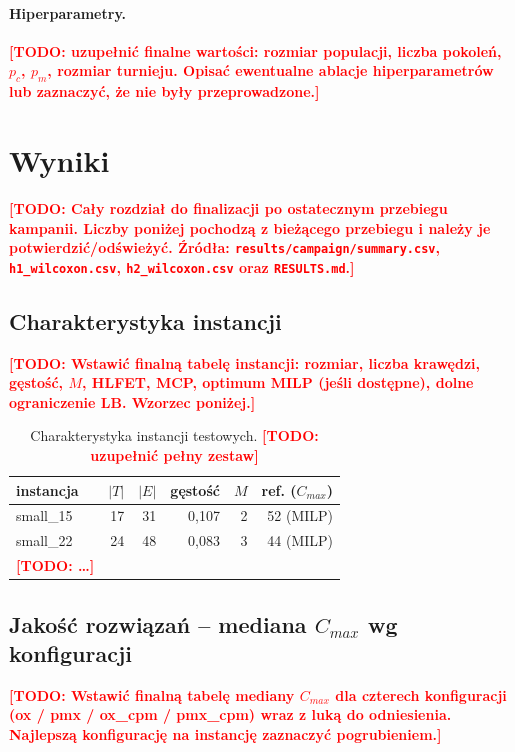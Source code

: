 \documentclass[12pt,a4paper]{article}
\newcommand{\todo}[1]{\textcolor{red}{\textbf{[TODO: #1]}}}
\begin{document}
\paragraph{Hiperparametry.} \todo{uzupełnić finalne wartości: rozmiar populacji, liczba pokoleń, $p_c$, $p_m$, rozmiar turnieju. Opisać ewentualne ablacje hiperparametrów lub zaznaczyć, że nie były przeprowadzone.}

\section{Wyniki}
\label{sec:wyniki}
\todo{Cały rozdział do finalizacji po ostatecznym przebiegu kampanii. Liczby poniżej pochodzą z bieżącego przebiegu i należy je potwierdzić/odświeżyć. Źródła: \texttt{results/campaign/summary.csv}, \texttt{h1\_wilcoxon.csv}, \texttt{h2\_wilcoxon.csv} oraz \texttt{RESULTS.md}.}

\subsection{Charakterystyka instancji}
\todo{Wstawić finalną tabelę instancji: rozmiar, liczba krawędzi, gęstość, $M$, HLFET, MCP, optimum MILP (jeśli dostępne), dolne ograniczenie LB. Wzorzec poniżej.}

\begin{table}[h]
\centering
\small
\begin{tabular}{lrrrrr}
\toprule
instancja & $|T|$ & $|E|$ & gęstość & $M$ & ref. ($C_{max}$) \\
\midrule
small\_15 & 17 & 31 & 0{,}107 & 2 & 52 (MILP) \\
small\_22 & 24 & 48 & 0{,}083 & 3 & 44 (MILP) \\
\todo{\dots} & & & & & \\
\bottomrule
\end{tabular}
\caption{Charakterystyka instancji testowych. \todo{uzupełnić pełny zestaw}}
\label{tab:instances}
\end{table}

\subsection{Jakość rozwiązań -- mediana $C_{max}$ wg konfiguracji}
\todo{Wstawić finalną tabelę mediany $C_{max}$ dla czterech konfiguracji (ox / pmx / ox\_cpm / pmx\_cpm) wraz z luką do odniesienia. Najlepszą konfigurację na instancję zaznaczyć pogrubieniem.}
\end{document}
